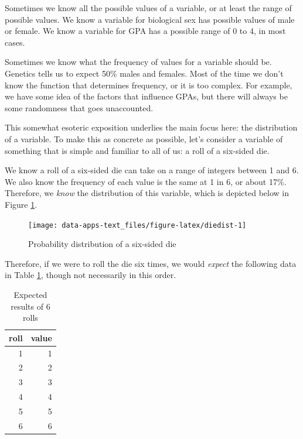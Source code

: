 \documentclass[
]{book}
\begin{document}
Sometimes we know all the possible values of a variable, or at least the range of possible values. We know a variable for biological sex has possible values of male or female. We know a variable for GPA has a possible range of 0 to 4, in most cases.

Sometimes we know what the frequency of values for a variable should be. Genetics tells us to expect 50\% males and females. Most of the time we don't know the function that determines frequency, or it is too complex. For example, we have some idea of the factors that influence GPAs, but there will always be some randomness that goes unaccounted.

This somewhat esoteric exposition underlies the main focus here: the distribution of a variable. To make this as concrete as possible, let's consider a variable of something that is simple and familiar to all of us: a roll of a six-sided die.

We know a roll of a six-sided die can take on a range of integers between 1 and 6. We also know the frequency of each value is the same at 1 in 6, or about 17\%. Therefore, we \emph{know} the distribution of this variable, which is depicted below in Figure \ref{fig:diedist}.

\begin{figure}

{\centering \texttt{[image: data-apps-text\_files/figure-latex/diedist-1]} 

}

\caption{Probability distribution of a six-sided die}\label{fig:diedist}
\end{figure}

Therefore, if we were to roll the die six times, we would \emph{expect} the following data in Table \ref{tab:dietable}, though not necessarily in this order.

\begin{table}

\caption{\label{tab:dietable}Expected results of 6 rolls}
\centering
\begin{tabular}[t]{r|r}
\hline
roll & value\\
\hline
1 & 1\\
\hline
2 & 2\\
\hline
3 & 3\\
\hline
4 & 4\\
\hline
5 & 5\\
\hline
6 & 6\\
\hline
\end{tabular}
\end{table}
\end{document}
